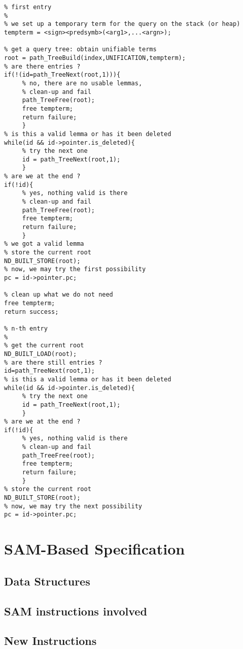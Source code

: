 \begin{verbatim}
% first entry
%
% we set up a temporary term for the query on the stack (or heap)
tempterm = <sign><predsymb>(<arg1>,...<argn>);

% get a query tree: obtain unifiable terms
root = path_TreeBuild(index,UNIFICATION,tempterm);
% are there entries ?
if(!(id=path_TreeNext(root,1))){
     % no, there are no usable lemmas,
     % clean-up and fail
     path_TreeFree(root);
     free tempterm;
     return failure;
     }
% is this a valid lemma or has it been deleted
while(id && id->pointer.is_deleted){
     % try the next one
     id = path_TreeNext(root,1);
     }
% are we at the end ?
if(!id){
     % yes, nothing valid is there
     % clean-up and fail
     path_TreeFree(root);
     free tempterm;
     return failure;
     }
% we got a valid lemma
% store the current root
ND_BUILT_STORE(root);
% now, we may try the first possibility
pc = id->pointer.pc;

% clean up what we do not need
free tempterm;
return success;

% n-th entry
%
% get the current root
ND_BUILT_LOAD(root);
% are there still entries ?
id=path_TreeNext(root,1);
% is this a valid lemma or has it been deleted
while(id && id->pointer.is_deleted){
     % try the next one
     id = path_TreeNext(root,1);
     }
% are we at the end ?
if(!id){
     % yes, nothing valid is there
     % clean-up and fail
     path_TreeFree(root);
     free tempterm;
     return failure;
     }
% store the current root
ND_BUILT_STORE(root);
% now, we may try the next possibility
pc = id->pointer.pc;
\end{verbatim}

\section{SAM-Based Specification}

\subsection{Data Structures}

\subsection{SAM instructions involved}

\subsection{New Instructions}

